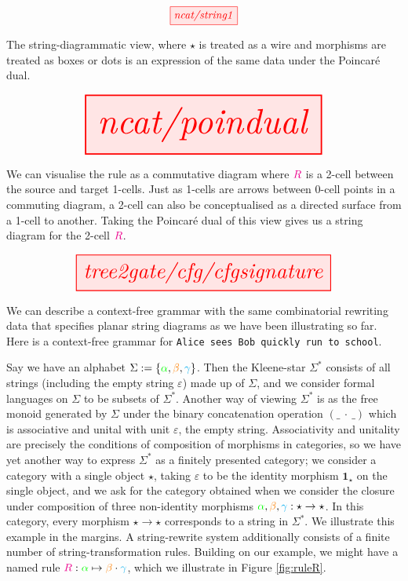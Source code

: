 \begin{marginfigure}
\centering
\[\tikzfig{ncat/string1}\]
\caption{The string-diagrammatic view, where $\star$ is treated as a wire and morphisms are treated as boxes or dots is an expression of the same data under the Poincar\'{e} dual.}
\end{marginfigure}

\begin{marginfigure}\label{fig:ruleR}
\centering
\[\resizebox{0.75\textwidth}{!}{\tikzfig{ncat/poindual}}\]
\caption{We can visualise the rule as a commutative diagram where $\textcolor{magenta}{R}$ is a 2-cell between the source and target 1-cells. Just as 1-cells are arrows between 0-cell points in a commuting diagram, a 2-cell can also be conceptualised as a directed surface from a 1-cell to another. Taking the Poincar\'{e} dual of this view gives us a string diagram for the 2-cell $\textcolor{magenta}{R}$.}
\end{marginfigure}

\begin{marginfigure}\label{fig:cfgsig}
\centering
\[\resizebox{0.75\textwidth}{!}{\tikzfig{tree2gate/cfg/cfgsignature}}\]
\caption{We can describe a context-free grammar with the same combinatorial rewriting data that specifies planar string diagrams as we have been illustrating so far. Here is a context-free grammar for \texttt{Alice sees Bob quickly run to school}.
}
\end{marginfigure}

Say we have an alphabet $\Sigma := \{\textcolor{green}{\alpha}, \textcolor{orange}{\beta}, \textcolor{cyan}{\gamma}\}$. Then the Kleene-star $\Sigma^*$ consists of all strings (including the empty string $\varepsilon$) made up of $\Sigma$, and we consider formal languages on $\Sigma$ to be subsets of $\Sigma^*$. Another way of viewing $\Sigma^*$ is as the free monoid generated by $\Sigma$ under the binary concatenation operation $(\_ \ \cdot \ \_)$ which is associative and unital with unit $\varepsilon$, the empty string. Associativity and unitality are precisely the conditions of composition of morphisms in categories, so we have yet another way to express $\Sigma^*$ as a finitely presented category; we consider a category with a single object $\star$, taking $\varepsilon$ to be the identity morphism $\textbf{1}_\star$ on the single object, and we ask for the category obtained when we consider the closure under composition of three non-identity morphisms $\textcolor{green}{\alpha}, \textcolor{orange}{\beta}, \textcolor{cyan}{\gamma}: \star \rightarrow \star$. In this category, every morphism $\star \rightarrow \star$ corresponds to a string in $\Sigma^*$. We illustrate this example in the margins. A string-rewrite system additionally consists of a finite number of string-transformation rules. Building on our example, we might have a named rule $\textcolor{magenta}{R}: \textcolor{green}{\alpha} \mapsto \textcolor{orange}{\beta} \cdot \textcolor{cyan}{\gamma}$, which we illustrate in Figure \ref{fig:ruleR}.\\

